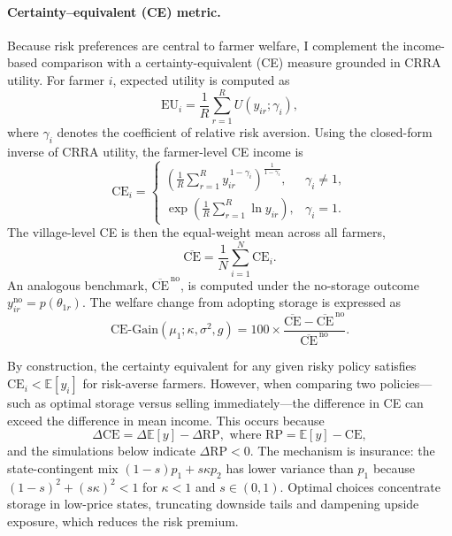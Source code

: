 \paragraph{Certainty–equivalent (CE) metric.}  
Because risk preferences are central to farmer welfare, I complement the income-based comparison with a certainty-equivalent (CE) measure grounded in CRRA utility. For farmer $i$, expected utility is computed as  
\begin{equation}
\mathrm{EU}_i
=\frac{1}{R}\sum_{r=1}^R U(y_{ir};\gamma_i),
\end{equation}
where $\gamma_i$ denotes the coefficient of relative risk aversion. Using the closed-form inverse of CRRA utility, the farmer-level CE income is  
\begin{equation}
\mathrm{CE}_i=
\begin{cases}
\left(\frac{1}{R}\sum_{r=1}^R y_{ir}^{\,1-\gamma_i}\right)^{\!\!\tfrac{1}{1-\gamma_i}}, & \gamma_i\neq 1,\\[8pt]
\exp\!\left(\frac{1}{R}\sum_{r=1}^R \ln y_{ir}\right), & \gamma_i=1.
\end{cases}
\end{equation}
The village-level CE is then the equal-weight mean across all farmers,  
$$
\overline{\mathrm{CE}}=\frac{1}{N}\sum_{i=1}^N \mathrm{CE}_i.
$$
An analogous benchmark, $\overline{\mathrm{CE}}^{\,\text{no}}$, is computed under the no-storage outcome $y^{\text{no}}_{ir}=p(\theta_{1r})$. The welfare change from adopting storage is expressed as  
\begin{equation}
\mathrm{CE\text{-}Gain}(\mu_1;\kappa,\sigma^2,g)
=100\times
\frac{\overline{\mathrm{CE}}-\overline{\mathrm{CE}}^{\,\text{no}}}{\overline{\mathrm{CE}}^{\,\text{no}}}.
\end{equation}

By construction, the certainty equivalent for any given risky policy satisfies $\mathrm{CE}_i<\mathbb{E}[y_i]$ for risk-averse farmers.  
However, when comparing two policies---such as optimal storage versus selling immediately---the difference in CE can exceed the difference in mean income.  
This occurs because  
$$
\Delta \mathrm{CE}
=\Delta \mathbb{E}[y]
-\Delta \mathrm{RP},
\text{ where }
\mathrm{RP}=\mathbb{E}[y]-\mathrm{CE},
$$
and the simulations below indicate $\Delta \mathrm{RP}<0$. The mechanism is insurance: the state-contingent mix $(1-s)p_1 + s\kappa p_2$ has lower variance than $p_1$ because $(1-s)^2 + (s\kappa)^2 < 1$ for $\kappa < 1$ and $s \in (0,1)$. Optimal choices concentrate storage in low-price states, truncating downside tails and dampening upside exposure, which reduces the risk premium.

